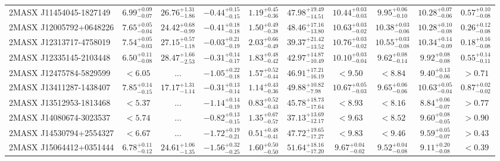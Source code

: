 \documentclass[onecolumn]{mn2e}
\begin{document}
\begin{landscape}
{\begin{center}
\begin{longtable}{lccccccccc}
2MASX J11454045-1827149 & $6.99_{-0.07}^{+0.09}$ & $26.76_{-1.86}^{+1.31}$ & $-0.44_{-0.15}^{+0.15}$ & $1.19_{-0.36}^{+0.45}$ &$47.98_{-14.51}^{+19.49}$ & $10.44_{-0.03}^{+0.03}$ & $9.95_{-0.10}^{+0.06}$ & $10.28_{-0.06}^{+0.07}$ & $0.57_{-0.08}^{+0.10}$ \\
2MASX J12005792+0648226 & $7.65_{-0.04}^{+0.05}$ & $24.42_{-0.99}^{+0.68}$ & $-0.41_{-0.18}^{+0.18}$ & $1.50_{-0.38}^{+0.49}$ &$48.46_{-13.80}^{+17.16}$ & $10.63_{-0.02}^{+0.03}$ & $10.38_{-0.06}^{+0.03}$ & $10.28_{-0.08}^{+0.10}$ & $0.26_{-0.08}^{+0.12}$ \\
2MASX J12313717-4758019 & $7.54_{-0.03}^{+0.05}$ & $27.15_{-1.18}^{+0.57}$ & $-0.03_{-0.19}^{+0.21}$ & $2.03_{-0.49}^{+0.66}$ &$39.37_{-13.52}^{+21.42}$ & $10.76_{-0.02}^{+0.03}$ & $10.55_{-0.08}^{+0.03}$ & $10.34_{-0.09}^{+0.14}$ & $0.18_{-0.08}^{+0.16}$ \\
2MASX J12335145-2103448 & $6.50_{-0.08}^{+0.11}$ & $28.47_{-2.53}^{+1.66}$ & $-0.31_{-0.17}^{+0.14}$ & $1.83_{-0.42}^{+0.48}$ &$42.97_{-10.49}^{+14.87}$ & $10.10_{-0.04}^{+0.03}$ & $9.62_{-0.14}^{+0.08}$ & $9.92_{-0.08}^{+0.08}$ & $0.55_{-0.11}^{+0.14}$ \\
2MASX J12475784-5829599 & $<6.05$ & ... & $-1.05_{-0.18}^{+0.22}$ & $1.57_{-0.44}^{+0.52}$ &$46.91_{-16.19}^{+17.21}$ & $<9.50$ & $<8.84$ & $9.40_{-0.06}^{+0.13}$ & $>0.71$ \\
2MASX J13411287-1438407 & $7.85_{-0.15}^{+0.14}$ & $17.17_{-1.14}^{+1.31}$ & $-0.31_{-0.14}^{+0.13}$ & $1.14_{-0.36}^{+0.43}$ &$49.88_{-7.98}^{+10.82}$ & $10.67_{-0.03}^{+0.05}$ & $9.65_{-0.06}^{+0.06}$ & $10.63_{-0.04}^{+0.05}$ & $0.87_{-0.02}^{+0.02}$ \\
2MASX J13512953-1813468 & $<5.37$ & ... & $-1.14_{-0.19}^{+0.14}$ & $0.83_{-0.43}^{+0.52}$ &$45.78_{-17.64}^{+18.73}$ & $<8.93$ & $<8.16$ & $8.84_{-0.07}^{+0.06}$ & $>0.77$ \\
2MASX J14080674-3023537 & $<5.74$ & ... & $-0.82_{-0.15}^{+0.13}$ & $1.35_{-0.57}^{+0.67}$ &$37.13_{-12.17}^{+13.69}$ & $<9.63$ & $<8.52$ & $9.60_{-0.05}^{+0.08}$ & $>0.90$ \\
2MASX J14530794+2554327 & $<6.67$ & ... & $-1.72_{-0.21}^{+0.19}$ & $0.51_{-0.41}^{+0.48}$ &$47.72_{-17.27}^{+19.65}$ & $<9.83$ & $<9.46$ & $9.59_{-0.07}^{+0.05}$ & $>0.43$ \\
2MASX J15064412+0351444 & $6.78_{-0.12}^{+0.11}$ & $24.61_{-1.35}^{+1.06}$ & $-1.56_{-0.25}^{+0.32}$ & $1.60_{-0.50}^{+0.50}$ &$51.64_{-17.20}^{+18.16}$ & $9.67_{-0.02}^{+0.04}$ & $9.52_{-0.08}^{+0.04}$ & $9.11_{-0.08}^{+0.20}$ & $<0.39$ \\

\end{longtable}
\end{center}}
\end{landscape}
\end{document}
